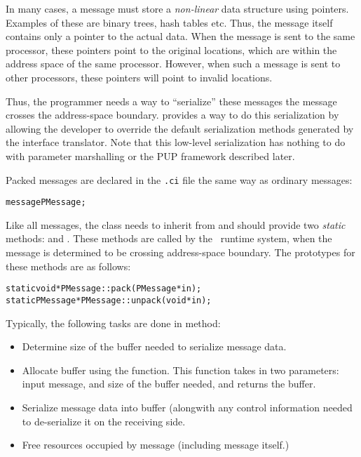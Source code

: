 
In many cases, a message must store a {\em non-linear} data structure using
pointers.  Examples of these are binary trees, hash tables etc. Thus, the
message itself contains only a pointer to the actual data. When the message is
sent to the same processor, these pointers point to the original locations,
which are within the address space of the same processor. However, when such a
message is sent to other processors, these pointers will point to invalid
locations.

Thus, the programmer needs a way to ``serialize'' these messages
 the
message crosses the address-space boundary.  \charmpp{} provides a way to do
this serialization by allowing the developer to override the default
serialization methods generated by the \charmpp{} interface translator.
Note that this low-level serialization has nothing to do with parameter
marshalling or the PUP framework described later.

Packed messages are declared in the {\tt .ci} file the same way as ordinary
messages:

\begin{alltt}
message PMessage;
\end{alltt}

Like all messages, the class  needs to inherit from
 and should provide two {\em static} methods: 
and . These methods are called by the \charmpp\ runtime system, when
the message is determined to be crossing address-space boundary. The prototypes
for these methods are as follows:

\begin{alltt}
static void *PMessage::pack(PMessage *in);
static PMessage *PMessage::unpack(void *in);
\end{alltt}

Typically, the following tasks are done in  method:

\begin{itemize}

\item Determine size of the buffer needed to serialize message data.

\item Allocate buffer using the  function. This function
takes in two parameters: input message, and size of the buffer needed, and
returns the buffer.

\item Serialize message data into buffer (alongwith any control information
needed to de-serialize it on the receiving side.

\item Free resources occupied by message (including message itself.)  

\end{itemize}


